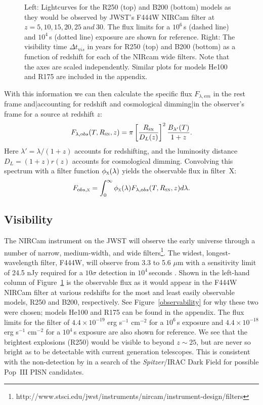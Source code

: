 \documentclass{thesis}
\newcommand{\RefFig}[1]{\mbox{Figure~\ref{#1}}}
\begin{document}
\begin{figure}
\begin{center}
{\begin{picture}
  \end{picture}}
\caption{Left: Lightcurves for the
  \citet{KasenWoosleyHeger2011} R250 (top) and B200 (bottom) models as
  they would be observed by JWST's F444W NIRCam filter at $z = 5, 10,
  15, 20, 25 \:{\mathrm and}\: 30$. The flux limits for a $10^6\,$s
  (dashed line) and $10^4\,$s (dotted line) exposure are shown for
  reference.  Right: The visibility time $\Delta t_{\mathrm vis}$ in years
  for R250 (top) and B200 (bottom) as a function of redshift for each
  of the NIRcam wide filters. Note that the axes are scaled
  independently.  Similar plots for models He100 and R175 are included
  in the appendix.}
   \label{visibility}
 \end{center}
\end{figure} 

With this information we can then calculate the specific flux
$F_{\lambda, \mathrm em}$ in the rest frame and|accounting for redshift
and cosmological dimming|in the observer's frame for a source at
redshift $z$:
\begin{equation}
F_{\lambda, \mathrm obs}(T,R_{\textsc{sn}}, z) = \pi
\left[\frac{R_{\textsc{sn}}}{D_L(z)}\right]^2
\frac{B_{\lambda'}(T)}{1+z}.
\end{equation}
Here $\lambda' = \lambda/(1+z)$ accounts for redshifting, and the
luminosity distance $D_L = (1+z) r(z)$ accounts for cosmological
dimming.  Convolving this spectrum with a filter function
$\phi_\textsc{x}(\lambda)$ yields the observable flux in filter~X:
\begin{equation}
F_{\mathrm obs, \textsc{x}} = \int_{0}^{\infty} \phi_\textsc{x}(\lambda)
F_{\lambda, \mathrm obs}(T,R_{\textsc{sn}}, z) d\lambda.
\end{equation}

\subsection{Visibility}
The NIRCam instrument on the JWST will observe the early universe
through a number of narrow, medium-width, and wide
filters\footnote{http://www.stsci.edu/jwst/instruments/nircam/instrument-design/filters}.
The widest, longest-wavelength filter, F444W, will observe from 3.3 to
5.6 $\mu$m with a sensitivity limit of 24.5 nJy required for a
$10\sigma$ detection in $10^4\,$seconds \citep{Gardneretal2006}. Shown
in the left-hand column of \RefFig{visibility} is the observable flux
as it would appear in the F444W NIRCam filter at various redshifts for
the most and least easily observable models, R250 and B200,
respectively. See \RefFig{observability} for why these two were
chosen; models He100 and R175 can be found in the appendix.  The flux
limits for the filter of $4.4 \times 10^{-19}$ erg s$^{-1}$ cm$^{-2}$
for a $10^6\,$s exposure and $4.4 \times 10^{-18}$ erg s$^{-1}$
cm$^{-2}$ for a $10^4\,$s exposure are also shown for reference.  We
see that the brightest explosions (R250) would be visible to beyond
$z\sim25$, but are never so bright as to be detectable with current
generation telescopes.  This is consistent with the non-detection by
\citet{Frostetal2009} in a search of the \textit{Spitzer}/IRAC Dark Field
for possible Pop~III PISN candidates.
\end{document}
